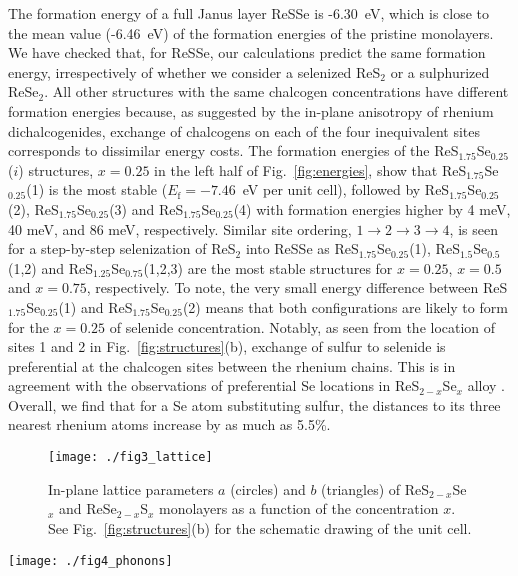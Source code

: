 \documentclass[reprint, superscriptaddress, amsmath,amssymb,prb,twocolumn]{revtex4-2}
\def\SSex{ReS$_{2-x}$Se$_x$}
\def\SSeOne{ReS$_{1.75}$Se$_{0.25}$}
\def\SSeTwo{ReS$_{1.5}$Se$_{0.5}$}
\def\SSeThree{ReS$_{1.25}$Se$_{0.75}$}
\def\SeSx{ReSe$_{2-x}$S$_x$}
\begin{document}
The formation energy of a full Janus layer ReSSe is -6.30~eV, which is close to the mean value (-6.46~eV) of the formation energies of the pristine monolayers. We have checked that, for ReSSe, our calculations predict the same formation energy, irrespectively of whether we consider a selenized ReS$_{2}$ or a sulphurized ReSe$_{2}$. All other structures with the same chalcogen concentrations have different formation energies because, as suggested by the in-plane anisotropy of rhenium dichalcogenides, exchange of chalcogens on each of the four inequivalent sites corresponds to dissimilar energy costs. The formation energies of the \SSeOne{}($i$) structures, $x=0.25$ in the left half of Fig.~\ref{fig:energies}, show that \SSeOne{}(1) is the most stable ($E_{\mathrm{f}}=-7.46$~eV per unit cell), followed by \SSeOne{}(2), \SSeOne{}(3) and \SSeOne{}(4) with formation energies higher by 4 meV, 40 meV, and 86 meV, respectively. Similar site ordering, $1\rightarrow2\rightarrow3\rightarrow4$, is seen for a step-by-step selenization of ReS$_{2}$ into ReSSe as \SSeOne{}(1), \SSeTwo{}(1,2) and \SSeThree{}(1,2,3) are the most stable structures for $x=0.25$, $x=0.5$ and $x=0.75$, respectively. To note, the very small energy difference between \SSeOne{}(1) and \SSeOne{}(2) means that both configurations are likely to form for the $x=0.25$ of selenide concentration. Notably, as seen from the location of sites 1 and 2 in Fig.~\ref{fig:structures}(b), exchange of sulfur to selenide is preferential at the chalcogen sites between the rhenium chains. This is in agreement with the observations of preferential Se locations in ReS$_{2-x}$Se$_{x}$ alloy \cite{wen_nanoscale_2017}. Overall, we find that for a Se atom substituting sulfur, the distances to its three nearest rhenium atoms increase by as much as 5.5\%. 

\begin{figure}[!t]
\begin{center}
\texttt{[image: ./fig3\_lattice]}
\caption{In-plane lattice parameters $a$ (circles) and $b$ (triangles) of \SSex{} and \SeSx{} monolayers as a function of the concentration $x$. See Fig.~\ref{fig:structures}(b) for the schematic drawing of the unit cell.}
\label{fig:lattice}
\end{center}
\end{figure}

\begin{figure*}[bt]
\begin{center}
\texttt{[image: ./fig4\_phonons]}
\caption{Phonon spectra of ReS$_{2}$ (left), ReS$_{1.5}$Se$_{0.5}$(1,2) (centre) and ReSSe (right) along wave vector path as indicated in Fig.~\ref{fig:structures}.}
\label{fig:phonons}
\end{center}
\end{figure*}
\end{document}
